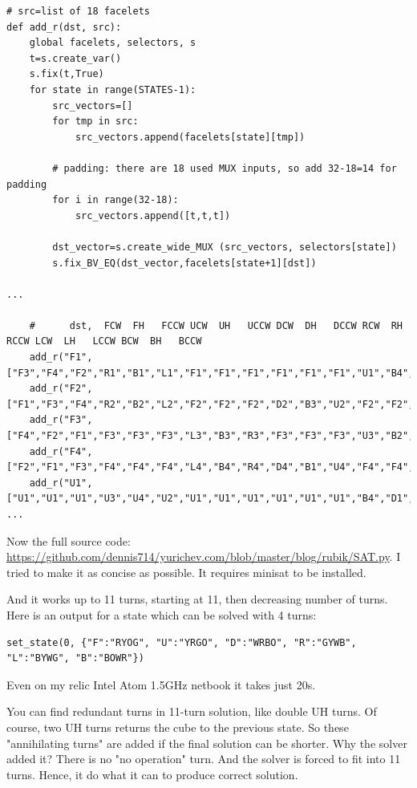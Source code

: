 \begin{lstlisting}
# src=list of 18 facelets
def add_r(dst, src):
    global facelets, selectors, s
    t=s.create_var()
    s.fix(t,True)
    for state in range(STATES-1):
        src_vectors=[]
        for tmp in src:
            src_vectors.append(facelets[state][tmp])

        # padding: there are 18 used MUX inputs, so add 32-18=14 for padding
        for i in range(32-18): 
            src_vectors.append([t,t,t])

        dst_vector=s.create_wide_MUX (src_vectors, selectors[state])
        s.fix_BV_EQ(dst_vector,facelets[state+1][dst])

...

    #      dst,  FCW  FH   FCCW UCW  UH   UCCW DCW  DH   DCCW RCW  RH   RCCW LCW  LH   LCCW BCW  BH   BCCW
    add_r("F1",["F3","F4","F2","R1","B1","L1","F1","F1","F1","F1","F1","F1","U1","B4","D1","F1","F1","F1"])
    add_r("F2",["F1","F3","F4","R2","B2","L2","F2","F2","F2","D2","B3","U2","F2","F2","F2","F2","F2","F2"])
    add_r("F3",["F4","F2","F1","F3","F3","F3","L3","B3","R3","F3","F3","F3","U3","B2","D3","F3","F3","F3"])
    add_r("F4",["F2","F1","F3","F4","F4","F4","L4","B4","R4","D4","B1","U4","F4","F4","F4","F4","F4","F4"])
    add_r("U1",["U1","U1","U1","U3","U4","U2","U1","U1","U1","U1","U1","U1","B4","D1","F1","R2","D4","L3"])
...
\end{lstlisting}

Now the full source code: \url{https://github.com/dennis714/yurichev.com/blob/master/blog/rubik/SAT.py}.
I tried to make it as concise as possible.
It requires minisat to be installed.

And it works up to 11 turns, starting at 11, then decreasing number of turns.
Here is an output for a state which can be solved with 4 turns:

\begin{lstlisting}
set_state(0, {"F":"RYOG", "U":"YRGO", "D":"WRBO", "R":"GYWB", "L":"BYWG", "B":"BOWR"})
\end{lstlisting}



Even on my relic Intel Atom 1.5GHz netbook it takes just 20s.

You can find redundant turns in 11-turn solution, like double UH turns.
Of course, two UH turns returns the cube to the previous state.
So these "annihilating turns" are added if the final solution can be shorter.
Why the solver added it? There is no "no operation" turn. And the solver is forced to fit into 11 turns.
Hence, it do what it can to produce correct solution.

